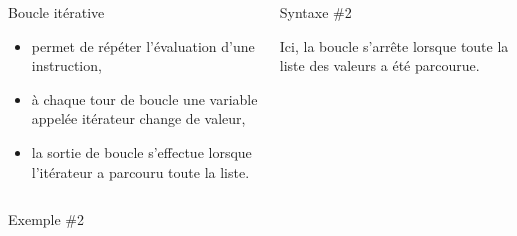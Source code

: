 \begin{frame}{}
  \begin{columns}
    \begin{column}{5cm}
      \begin{block}{ Boucle itérative}
        \begin{itemize}
        \item permet de répéter l'évaluation d'une instruction,
        \item à chaque tour de boucle une variable appelée itérateur change de valeur,
        \item la sortie de boucle s'effectue lorsque l'itérateur a parcouru toute la liste.
        \end{itemize}
      \end{block}
    \end{column}
    \begin{column}{6cm}
      \begin{block}{Syntaxe \#2}
        \begin{center}
        \end{center}
        Ici, la boucle s'arrête lorsque toute la liste des valeurs a été parcourue.
      \end{block}
    \end{column}
  \end{columns}
  \begin{block}{Exemple \#2}
    \small{%
      \begin{columns}
        \begin{column}{5cm}
        \end{column}
        \begin{column}{5.5cm}
        \end{column}
      \end{columns}
    }
  \end{block}
\end{frame}


